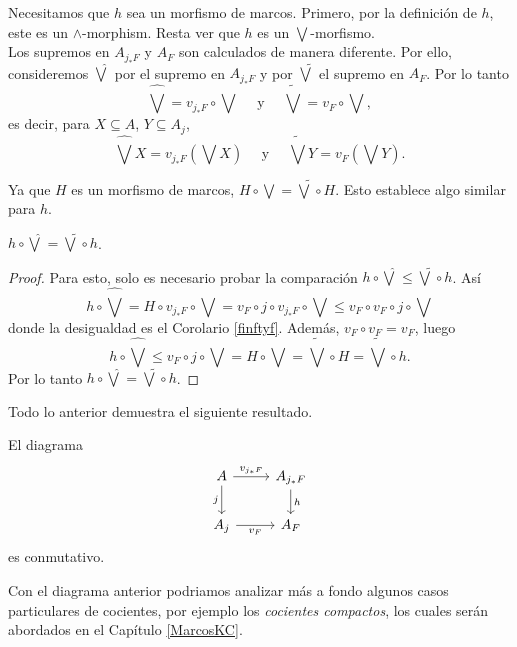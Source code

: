 Necesitamos que $h$ sea un morfismo de marcos. Primero, por la definición de $h$, este es un $\wedge$-morphism. Resta ver que $h$ es un $\bigvee$-morfismo.\\

Los supremos en $A_{j_*F}$ y $A_F$ son calculados de manera diferente. Por ello, consideremos $\hat{\bigvee}$ por el supremo en $A_{j_*F}$ y por $\tilde{\bigvee}$ el supremo en $A_F$. Por lo tanto
\[
\hat{\bigvee}=v_{j_*F}\circ \bigvee\quad\mbox{ y }\quad \tilde{\bigvee}=v_{F}\circ \bigvee,
\] 
es decir, para $X\subseteq A$, $Y\subseteq A_j$,
\[
	\hat{\bigvee}X=v_{j_*F}(\bigvee X)\quad\mbox{ y }\quad \tilde{\bigvee}Y=v_{F}(\bigvee Y).
\]

Ya que $H$ es un morfismo de marcos, $H\circ \bigvee=\tilde{\bigvee}\circ H$. Esto establece algo similar para $h$.

\begin{lem}\label{bigvee g}
$h\circ \hat{\bigvee}=\tilde{\bigvee}\circ h$.
\end{lem}

\begin{proof}
Para esto, solo es necesario probar la comparación $h\circ \hat{\bigvee}\leq \tilde{\bigvee}\circ h$. Así
\[
h\circ \hat{\bigvee}=H\circ v_{j_*F}\circ \bigvee=v_F\circ j\circ v_{j_*F}\circ \bigvee\leq v_F\circ v_F\circ j\circ \bigvee
\]
donde la desigualdad es el Corolario \ref{finftyf}. Además, $v_F\circ v_F=v_F$, luego
\[
h\circ\hat{\bigvee}\leq v_F\circ j\circ \bigvee =H\circ \bigvee=\tilde{\bigvee}\circ H=\tilde{\bigvee}\circ h.
\]
Por lo tanto $h\circ\hat{\bigvee}=\tilde{\bigvee}\circ h$.
\end{proof}

Todo lo anterior demuestra el siguiente resultado.

\begin{prop}\label{VFsquare}
El diagrama
\[\begin{tikzcd}
	A & {A_{j_*F}} \\
	{A_j} & {A_F}
	\arrow["{v_{j_*F}}", from=1-1, to=1-2]
	\arrow["j"', from=1-1, to=2-1]
	\arrow["h", from=1-2, to=2-2]
	\arrow["{v_F}"', from=2-1, to=2-2]
\end{tikzcd}\]
es conmutativo.
\end{prop}

Con el diagrama anterior podriamos analizar más a fondo algunos casos particulares de cocientes, por ejemplo los \emph{cocientes compactos}, los cuales serán abordados en el Capítulo \ref{MarcosKC}.